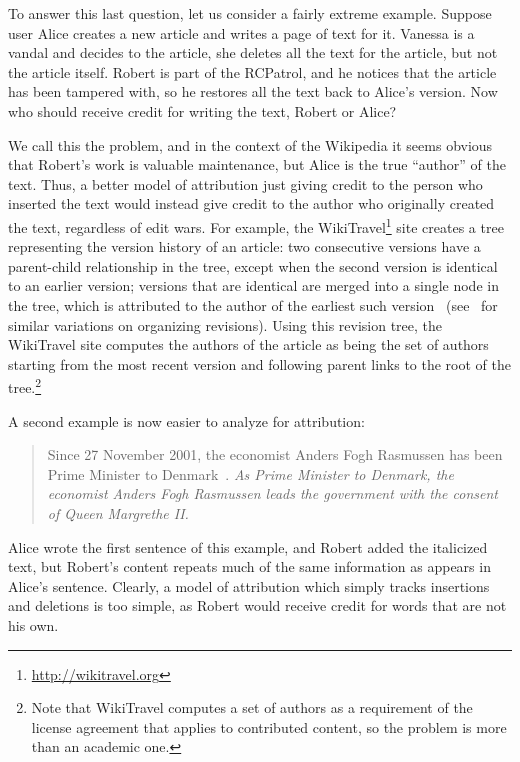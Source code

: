 To answer this last question, let us consider a fairly extreme example.
Suppose user Alice creates a new article and writes a page of text for it.
Vanessa is a vandal and decides to  the article,
\ie she deletes all the text for the article, but not the article itself.
Robert is part of the RCPatrol, and he notices that the article has
been tampered with, so he restores all the text back to Alice's version.
Now who should receive credit for writing the text, Robert or Alice?

We call this the  problem,
and in the context of the Wikipedia it seems obvious that Robert's
work is valuable maintenance, but Alice is the true ``author'' of the text.
Thus, a better model of attribution just giving credit
to the person who inserted the text would instead give credit
to the author who originally created the text,
regardless of edit wars.
For example, the WikiTravel\footnote{\url{http://wikitravel.org}}
site creates a tree representing
the version history of an article: two consecutive versions
have a parent-child relationship in the tree, except when
the second version is identical to an earlier version;
versions that are identical are merged into a single node
in the tree, which is attributed to the author of the earliest
such version~\cite{WikiTravelAuthorship}
(see~\cite{Ekstrand2009,Sabel2007} for similar variations
on organizing revisions).
Using this revision tree, the WikiTravel site computes the
authors of the article as being the set of authors starting
from the most recent version and following parent links
to the root of the tree.\footnote{Note that WikiTravel
computes a set of authors as a requirement
of the license agreement that applies to contributed content,
so the problem is more than an academic one.}


A second example is now easier to analyze for attribution:
%
\begin{quote}
Since 27 November 2001, the economist Anders Fogh Rasmussen
has been Prime Minister to Denmark~\cite{wiki:Denmark-Fogh}.
\textit{As Prime Minister to Denmark, the economist Anders Fogh Rasmussen
leads the government with the consent of Queen Margrethe II.}
\end{quote}
%
Alice wrote the first sentence of this example, and Robert
added the italicized text,
but Robert's content repeats much of the same information as
appears in Alice's sentence.
Clearly, a model of attribution which simply tracks insertions
and deletions is too simple, as Robert
would receive credit for words that are not his own.



